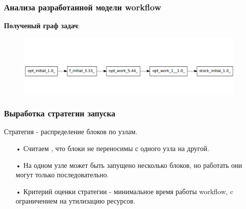 \documentclass[10pt,pdf,hyperref={unicode}]{beamer}
\begin{document}
\begin{frame}
\frametitle{Анализа разработанной модели workflow}
\textbf{Полученый граф задач}:
\begin{figure}[here]
    \centering
    \includegraphics[width=\textwidth]{task_graph.png} 
    \label{img:opt_wf}
\end{figure}
\end{frame}

\begin{frame}
\frametitle{Выработка стратегии запуска}

Стратегия - распределение блоков по узлам.
\begin{enumerate}
\item[•] Считаем , что блоки не переносимы с одного узла на другой.
\item[•] На одном узле может быть запущено несколько блоков, но работать они могут только последовательно.
\item[•] Критерий оценки стратегии - минимальное время работы workflow, c ограничением на утилизацию ресурсов.
\end{enumerate}
\end{frame}
\end{document}
